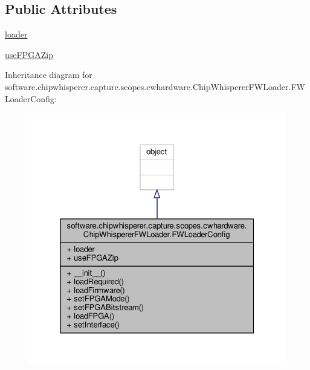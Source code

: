 \subsection*{Public Attributes}
\begin{DoxyCompactItemize}
\item 
\hyperlink{classsoftware_1_1chipwhisperer_1_1capture_1_1scopes_1_1cwhardware_1_1ChipWhispererFWLoader_1_1FWLoaderConfig_a1e1b431f39dbebf30f90f1567f9e661a}{loader}
\item 
\hyperlink{classsoftware_1_1chipwhisperer_1_1capture_1_1scopes_1_1cwhardware_1_1ChipWhispererFWLoader_1_1FWLoaderConfig_a3e13996f746ab7e02b2ff8283e701ff6}{use\+F\+P\+G\+A\+Zip}
\end{DoxyCompactItemize}


Inheritance diagram for software.\+chipwhisperer.\+capture.\+scopes.\+cwhardware.\+Chip\+Whisperer\+F\+W\+Loader.\+F\+W\+Loader\+Config\+:\nopagebreak
\begin{figure}[H]
\begin{center}
\leavevmode
\includegraphics[width=325pt]{d4/dfb/classsoftware_1_1chipwhisperer_1_1capture_1_1scopes_1_1cwhardware_1_1ChipWhispererFWLoader_1_1FWLoaderConfig__inherit__graph}
\end{center}
\end{figure}


